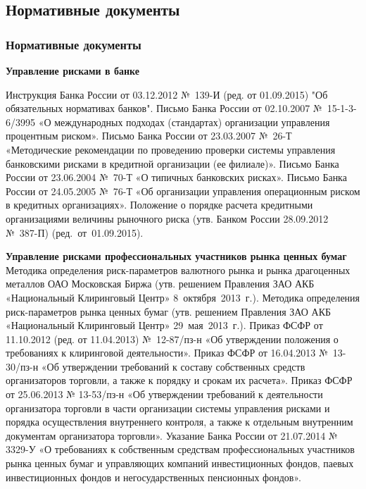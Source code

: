 \documentclass[financial_risks_lectures.tex]{subfiles}
\begin{document}
\subsection*{Нормативные документы}

\begin{frame}[allowframebreaks]
  \frametitle<presentation>{Нормативные документы}
	\textbf{Управление рисками в банке}
  \begin{thebibliography}{10}
  
  \beamertemplatearticlebibitems
	Инструкция Банка России от 03.12.2012 №~139-И (ред. от 01.09.2015) "Об обязательных нормативах банков".
	Письмо Банка России от 02.10.2007 №~15-1-3-6/3995 «О международных подходах (стандартах) организации управления процентным риском».
	Письмо Банка России от 23.03.2007 №~26-Т «Методические рекомендации по проведению проверки системы управления банковскими рисками в кредитной организации (ее филиале)».
	Письмо Банка России от 23.06.2004 №~70-Т «О типичных банковских рисках».
	Письмо Банка России от 24.05.2005 №~76-Т «Об организации управления операционным риском в кредитных организациях».
	Положение о порядке расчета кредитными организациями величины рыночного риска (утв. Банком России 28.09.2012 №~387-П) (ред.~от~01.09.2015).
\pagebreak

	\textbf{Управление рисками профессиональных участников рынка ценных бумаг}
    Методика определения риск-параметров валютного рынка и рынка драгоценных металлов ОАО Московская Биржа
    \newblock (утв. решением Правления ЗАО АКБ «Национальный Клиринговый Центр» 8~октября~2013~г.).
	Методика определения риск-параметров рынка ценных бумаг    \newblock (утв. решением Правления ЗАО АКБ «Национальный Клиринговый Центр» 29~мая~2013~г.).
 	Приказ ФСФР от 11.10.2012 (ред. от 11.04.2013) №~12-87/пз-н  «Об утверждении положения о требованиях к клиринговой деятельности».
	Приказ ФСФР от 16.04.2013 №~13-30/пз-н  «Об утверждении требований к составу собственных средств организаторов торговли, а также к порядку и срокам их расчета».
 	Приказ ФСФР от 25.06.2013 № 13-53/пз-н  «Об утверждении требований к деятельности организатора торговли в части организации системы управления рисками и порядка осуществления внутреннего контроля, а также к отдельным внутренним документам организатора торговли».
	Указание Банка России от 21.07.2014 № 3329-У «О требованиях к собственным средствам профессиональных участников рынка ценных бумаг и управляющих компаний инвестиционных фондов, паевых инвестиционных фондов и негосударственных пенсионных фондов».


\end{thebibliography}
\end{frame}
\end{document}

